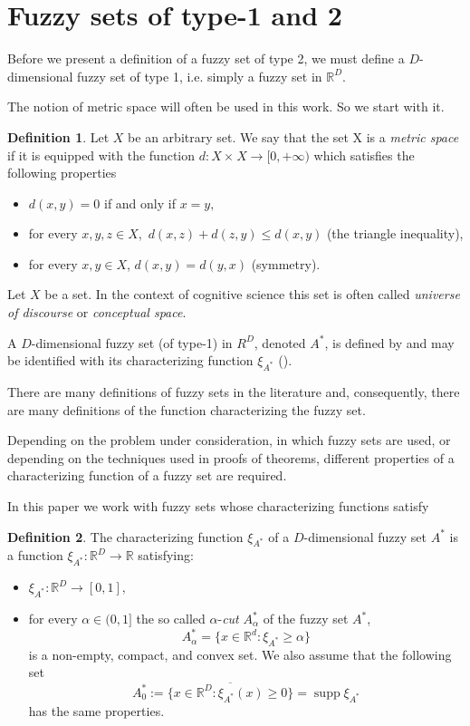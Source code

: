 \documentclass[leqno,12pt]{amsart}
\newcommand{\R}{\mathbb{R}}
\theoremstyle{remark}
\theoremstyle{remark}
\theoremstyle{remark}
\theoremstyle{definition}
\newtheorem{definition}{Definition}
\numberwithin{equation}{section}
\DeclareMathOperator{\supp}{supp}
\begin{document}
\section{Fuzzy sets of type-1 and 2}
Before we present a definition of a fuzzy set of type 2, we must define a $D$-dimensional fuzzy set of type 1, i.e. simply a fuzzy set in $\R^D$.
\par
The notion of metric space will often be used in this work. So we start with it.
\begin{definition}
Let $X$ be an arbitrary set. We say that the set X is a {\em metric space} if it is equipped with the function $d:X\times ^{}X\to[0,+\infty)$ which satisfies the following properties
\begin{itemize}
\item[(i)] $d(x, y)=0$ if and only if $x=y,$
\item[(ii)] for every $x,y,z\in X,$ $d(x,z)+d(z,y)\leq d(x,y)$
(the triangle inequality),
\item[(iii)] for every $x,y\in X$, $d(x,y)=d(y,x)$ (symmetry).
\end{itemize}
\end{definition}
Let $X$ be a set. In the context of cognitive science this set is often called {\em universe of discourse} or {\em conceptual space}.
\par
A $D$-dimensional fuzzy set (of type-1) in $R^D$, denoted $A^*$, is defined by and may be identified with its
characterizing function $\xi_{A^*}$ (\cite{19, 20}).
\par
There are many definitions of fuzzy sets in the literature and, consequently, there are many definitions of the function characterizing the fuzzy set.
\par
Depending on the problem under consideration, in which fuzzy sets are used, or depending on the techniques used in proofs of theorems, different properties of a characterizing function of a fuzzy set are required.
\par
In this paper we work with fuzzy sets
whose characterizing functions satisfy
\begin{definition}
The characterizing function $\xi_{A^*}$ of a $D$-dimensional fuzzy set $A^*$
is a function $\xi_{A^*}:\R^D\to\R$ satisfying:
\begin{itemize}
\item[(1)] $\xi_{A^*}:\R^D\to[0,1],$
\item[(3)] for every $\alpha\in (0, 1]$ the so called $\alpha$-{\em cut} $A^*_\alpha$ of the fuzzy set $A^*$,
$$A_\alpha^*=\{x\in\R^d: \xi_{A^*}\geq\alpha\}$$ is a non-empty, compact, and convex set. We also assume that the following set
$$A_0^*:=\overline{\{x\in\R^D:\xi_{A^*}(x)\geq 0\}}=\supp\xi_{A^*}$$
has the same properties.
\end{itemize}
\end{definition}
\end{document}
